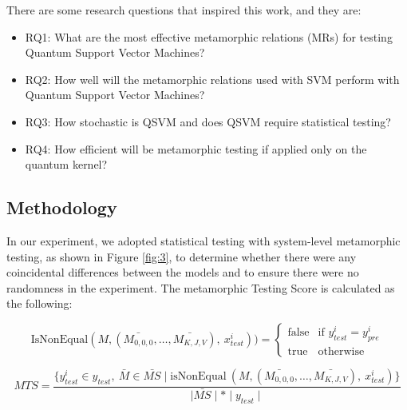 \documentclass[12pt,a4paper]{article}
\begin{document}
	There are some research questions that inspired this work, and they are:
	\begin{itemize}
		\item RQ1: What are the most effective metamorphic relations (MRs) for testing Quantum Support Vector Machines?
		\item RQ2: How well will the metamorphic relations used with SVM perform with Quantum Support Vector Machines?
		\item RQ3: How stochastic is QSVM and does QSVM require statistical testing?
		\item RQ4: How efficient will be metamorphic testing if applied only on the quantum kernel?
	\end{itemize}
	
	\subsection{Methodology}
	
	In our experiment, we adopted statistical testing with system-level metamorphic testing, as shown in Figure \ref{fig:3}, to determine whether there were any coincidental differences between the models and to ensure there were no randomness \cite{10.1145/1985793.1985795} in the experiment. The metamorphic Testing Score is calculated as the following:
	
	\[
	\text{IsNonEqual}(M, (\bar{M_{0,0,0}}, \ldots, \bar{M_{K,J,V}}),\  x_{test}^i)) =
	\begin{cases} 
		\text{false} & \text{if } y^i_{test} = y^i_{pre} 
		\\
		\text{true} & \text{otherwise}
	\end{cases}
	\]
	
	\begin{equation}
		\label{eq:MTS}
		MTS =  \frac{\{y^i_{test} \in y_{test},\ {\bar{M}} \in \bar{MS} \mid \text{isNonEqual} \ (M, (\bar{M_{0,0,0}}, \ldots, \bar{M_{K,J,V}}),\  x_{test}^i)\}}{\mid \bar{MS} \mid * \mid y_{test} \mid} 
	\end{equation}
	
\end{document}
